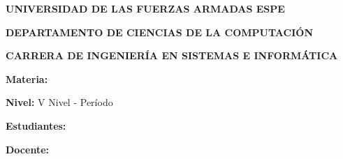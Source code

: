 \begin{titlepage}
    \centering
    
    \vspace*{1.5cm}
    
    {\Large\textbf{UNIVERSIDAD DE LAS FUERZAS ARMADAS ESPE}}
    
    \vspace{0.8cm}
    {\large\textbf{DEPARTAMENTO DE CIENCIAS DE LA COMPUTACIÓN}}
    
    \vspace{0.5cm}
    {\large\textbf{CARRERA DE INGENIERÍA EN SISTEMAS E INFORMÁTICA}}
    
    \vspace{3cm}
    
    \begin{center}
        \parbox{0.85\textwidth}{
            \centering
            {\huge\textbf{\GetTitle}}
        }
    \end{center}
    
    \vspace{1.5cm}
    
    \begin{center}
        \parbox{0.75\textwidth}{
            \centering
            {\Large\GetSubtitle}
        }
    \end{center}
    
    \vspace{3cm}
    
    {\large\textbf{Materia:} \GetCourse}
    
    \vspace{0.5cm}
    {\large\textbf{Nivel:} V Nivel - Período \GetAcademicYear}
    
    \vspace{2cm}
    
    {\large\textbf{Estudiantes:}}
    
    \vspace{0.8cm}
    {\large\GetFirstAuthor}
    
    \ifdefined\GetSecondAuthor
        \vspace{0.5cm}
        {\large\GetSecondAuthor}
    \fi
    
    \ifdefined\GetThirdAuthor
        \vspace{0.5cm}
        {\large\GetThirdAuthor}
    \fi
    
    \vspace{2cm}
    
    {\large\textbf{Docente:} \GetSupervisor}
    
    \vfill
    
    {\large\GetDate}
    
\end{titlepage}
